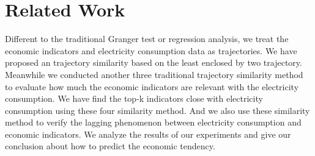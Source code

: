 
\section{Related Work} \label{sec:rel-wor}
Different to the traditional Granger test or regression analysis, we treat the economic indicators and electricity consumption data as trajectories. We have proposed an trajectory similarity based on the least enclosed by two trajectory. Meanwhile we conducted another three traditional trajectory similarity method to evaluate how much the economic indicators are relevant with the electricity consumption. We have find the top-k indicators close with electricity consumption using these four similarity method. And we also use these similarity method to verify the lagging phenomenon between electricity consumption and economic indicators. We analyze the results of our experiments and give our conclusion about how to predict the economic tendency. 